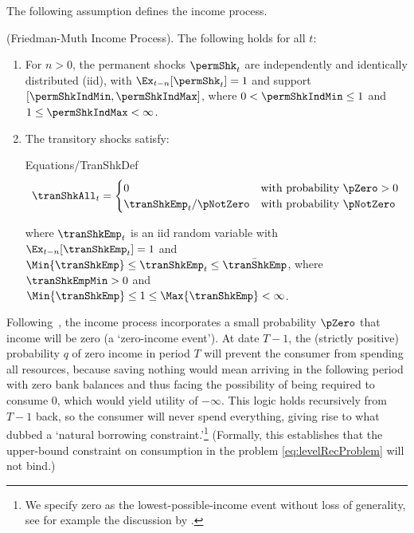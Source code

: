 \documentclass[BufferStockTheory]{subfiles}
\begin{document}
The following assumption defines the income process.


\begin{assumI}\label{ass:shocks}(Friedman-Muth Income Process).
The following holds for all $t$:
\begin{enumerate}
\item For $n>0$, the permanent shocks ${\permShk}_{t}$ are independently and identically distributed (iid), with  $\Ex_{t-n}[{\permShk}_{t}]=1$ and support $[\permShkIndMin,\permShkIndMax]$, where $0 < \permShkIndMin \leq 1$ and $1 \leq \permShkIndMax < \infty$. 
\item The transitory shocks satisfy: 
\begin{verbatimwrite}{Equations/TranShkDef}
  \begin{equation}
    \tranShkAll_{t}=
    \begin{cases}
      0\phantom{_{t+1}/\pNotZero} & \text{with probability $\pZero > 0$} \\
      \tranShkEmp_{t}/\pNotZero      & \text{with probability $\pNotZero  $} %
    \end{cases} \label{eq:TranShkDef}
  \end{equation}
\end{verbatimwrite}

\noindent where $\tranShkEmp_{t}$ is an iid random variable with $\Ex_{t-n}[{\tranShkEmp}_{t}]=1$ and $\Min{\tranShkEmp}\leq  \tranShkEmp_{t} \leq \bar{\tranShkEmp}$, where $\tranShkEmpMin >0$ and $\Min{\tranShkEmp} \leq 1 \leq \Max{\tranShkEmp} < \infty$.

\end{enumerate} 
\end{assumI}

Following~\cite{zeldesStochastic}, the income process incorporates a small probability $\pZero$ that income will be zero (a `zero-income event').
At date $T-1$, the (strictly positive) probability $q$ of zero income in period $T$ will prevent the consumer from spending all resources, because saving nothing would mean arriving in the following period with zero bank balances and thus facing the possibility of being required to consume 0, which would yield utility of $-\infty$.
This logic holds recursively from $T-1$ back, so  the consumer will never spend everything, giving rise to what \cite{aiyagari:ge} dubbed a `natural borrowing constraint.'\footnote{We specify zero as the lowest-possible-income event without loss of generality, see for example the discussion by \cite{aiyagari:ge}.} (Formally, this establishes that the upper-bound constraint on consumption in the problem \eqref{eq:levelRecProblem} will not bind.)
\end{document}
